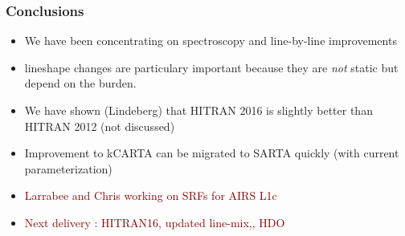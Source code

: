 \documentclass[10pt,t]{beamer}
\begin{document}
\begin{frame}
  \frametitle{Conclusions}
  \begin{itemize}
  \item We have been concentrating on spectroscopy and line-by-line
    improvements
  \item \cd lineshape changes are particulary important because they are
    \emph{not} static but depend on the \water burden.
  \item We have shown (Lindeberg) that HITRAN 2016 \water is slightly
    better than HITRAN 2012 (not discussed)
  \item Improvement to kCARTA can be migrated to SARTA quickly (with
    current parameterization)
  \item \textcolor{maroon}{Larrabee and Chris working on SRFs for AIRS L1c}
  \item \textcolor{maroon}{Next delivery : HITRAN16, updated \cd line-mix,\amm, HDO}
  \end{itemize}
\end{frame}
\end{document}
